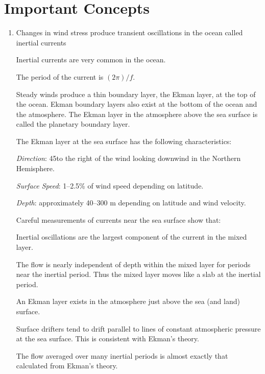 \section{Important Concepts}
\begin{enumerate}
\item Changes in wind stress
produce transient oscillations in the ocean called inertial
currents
\begin{enumerate}
\vitem Inertial currents are very common in the ocean.
  
\vitem The period of the current is $(2 \pi)/f$.
\end{enumerate}

\vitem Steady winds produce a thin boundary layer, the Ekman layer, at
the top of the ocean. Ekman boundary layers also exist at the bottom
of the ocean and the atmosphere.  The Ekman layer in the atmosphere
above the sea surface is called the planetary boundary layer.

\vitem The Ekman layer at the sea
surface has the following characteristics:
\begin{enumerate}
\vitem \textit{Direction}: 45\degrees to the right of the wind looking
downwind in the Northern Hemisphere.

\vitem \textit{Surface Speed}: 1--2.5\% of wind speed depending on
latitude.

\vitem \textit{Depth}: approximately 40--300 m depending on latitude
and wind velocity.
\end{enumerate}

\vitem Careful measurements of currents near the sea surface show
that:
\begin{enumerate}
\vitem Inertial oscillations are the largest component of the current
in the mixed layer.

\vitem The flow is nearly independent of depth within the mixed
layer for periods near the inertial
period. Thus the mixed layer moves like a slab
at the inertial period.

\vitem An Ekman layer exists in the atmosphere just above the sea (and
land) surface.

\vitem Surface drifters tend to drift parallel to
lines of constant atmospheric pressure at the sea surface. This is
consistent with Ekman's theory.

\vitem The flow averaged over many inertial periods is almost exactly
that calculated from Ekman's theory.
\end{enumerate}


\end{enumerate}
